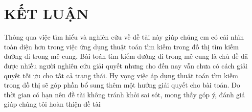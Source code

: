 

\chapter*{KẾT LUẬN} %

\label{Chapter5} %


Thông qua việc tìm hiểu và nghiên cứu về đề tài này giúp chúng em có cái nhìn toàn diện hơn trong việc ứng dụng thuật toán tìm kiếm trong đồ thị tìm kiếm đường đi trong mê cung. Bài toán tìm kiếm đường đi trong mê cung là chủ đề đã được nhiều người nghiên cứu giải quyết nhưng cho đến nay vẫn chưa có cách giải quyết tối ưu cho tất cả trạng thái. Hy vọng việc áp dụng thuật toán tìm kiếm trong đồ thị sẽ góp phần bổ sung thêm một hướng giải quyết cho bài toán. Do thời gian có hạn nên đề tài không tránh khỏi sai sót, mong thầy góp ý, đánh giá giúp chúng tôi hoàn thiện đề tài